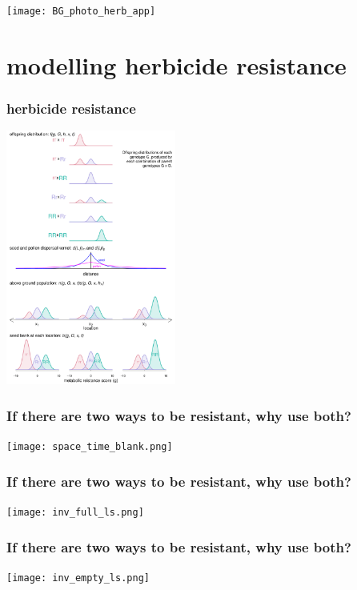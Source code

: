 \documentclass[]{beamer}
\begin{document}
\begin{frame}
	\texttt{[image: BG\_photo\_herb\_app]}
\end{frame}

\section{modelling herbicide resistance}
\begin{frame}
	\frametitle{herbicide resistance}
	\begin{center}
		\includegraphics[width=2.2in]{BG_pop_spatial_mod_schematic.pdf}\\
	\end{center} 
\end{frame}

\begin{frame}
	\frametitle{If there are two ways to be resistant, why use both?}
	\begin{center}
		\texttt{[image: space\_time\_blank.png]} 
	\end{center}
\end{frame}

\begin{frame}
	\frametitle{If there are two ways to be resistant, why use both?}
	\begin{center}
		\texttt{[image: inv\_full\_ls.png]} 
	\end{center}
\end{frame}

\begin{frame}
	\frametitle{If there are two ways to be resistant, why use both?}
	\begin{center}
		\texttt{[image: inv\_empty\_ls.png]} 
	\end{center}
\end{frame}
\end{document}
